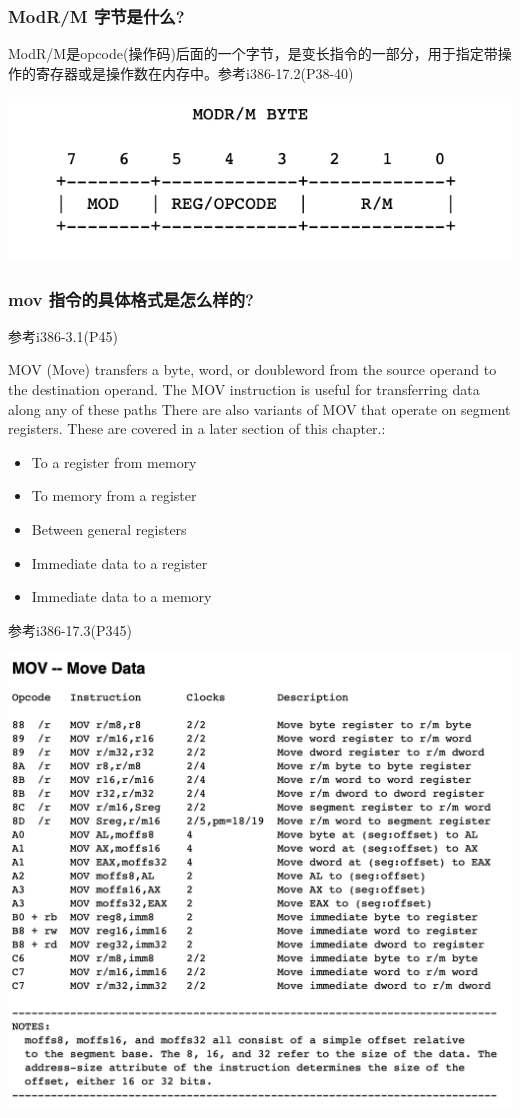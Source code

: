 \documentclass[UTF8,a4paper,10pt]{ctexart}
\begin{document}
\subsubsection{ModR/M 字节是什么?}
ModR/M是opcode(操作码)后面的一个字节，是变长指令的一部分，用于指定带操作的寄存器或是操作数在内存中。参考i386-17.2(P38-40)
\begin{center}
  \includegraphics{9}
\end{center}
\subsubsection{mov 指令的具体格式是怎么样的?}
参考i386-3.1(P45)\\
\par MOV (Move) transfers a byte, word, or doubleword from the source operand to the destination operand. The MOV instruction is useful for transferring data along any of these paths There are also variants of MOV that operate on segment registers. These are covered in a later section of this chapter.:
\begin{itemize}
  \item To a register from memory
  \item To memory from a register
  \item Between general registers
  \item Immediate data to a register
  \item Immediate data to a memory
\end{itemize}
\par 参考i386-17.3(P345)
\begin{center}
  \includegraphics[scale = 0.7]{10}
\end{center}
\end{document}
